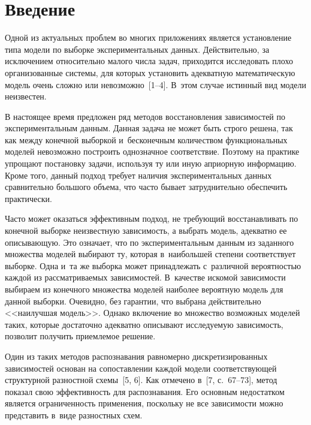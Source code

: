 
\thispagestyle{headings}

\begin{multicols}{2}

\label{st\stat}
  
\section{Введение}

  Одной из актуальных проблем во многих приложениях является 
установление типа модели по выборке экспериментальных данных. 
Действительно, за исключением относительно малого числа задач, приходится 
исследовать плохо организованные системы, для которых установить 
адекватную математическую модель очень сложно или невозможно~[1--4]. 
В~этом случае истинный вид модели неизвестен.
  
  В настоящее время предложен ряд методов восстановления зависимостей по 
экспериментальным данным. Данная задача не может быть строго решена, так 
как между конечной выборкой и~бесконечным количеством функциональных 
моделей невозможно построить однозначное соответствие. Поэтому на 
практике упрощают постановку задачи, используя ту или иную априорную 
информацию. Кроме того, данный подход требует наличия экспериментальных 
данных сравнительно большого объема, что часто бывает затруднительно 
обеспечить практически.
  
  Часто может оказаться эффективным подход, не требующий восстанавливать 
по конечной выборке неизвестную зависимость, а выбрать модель, адекватно ее 
описывающую. Это означает, что по экспериментальным данным из заданного 
мно\-жества моделей выбирают ту, которая в~наибольшей степени соответствует 
выборке. Одна и~та же выборка может принадлежать с~различной вероятностью 
каждой из рассматриваемых зависимостей. В~качестве искомой зависимости 
выбираем из конечного мно\-жества моделей наиболее вероятную модель для 
данной выборки. Очевидно, без гарантии, что выбрана действительно 
<<наилучшая модель>>. Однако включение во множество возможных моделей 
таких, которые достаточно адекватно описывают исследуемую зависимость, 
позволит получить приемлемое решение.
  
  Один из таких методов распознавания равномерно дискретизированных 
зависимостей основан на сопоставлении каждой модели соответствующей 
структурной разностной схемы~[5, 6]. Как отмечено в~[7, с.~67--73], метод 
показал свою эффективность для распознавания. Его основным недостатком 
является ограниченность применения, поскольку не все зависимости можно 
представить в~виде разностных схем.


\end{multicols}
